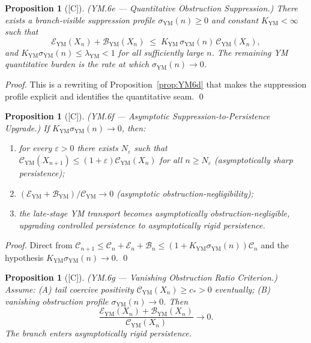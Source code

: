 \documentclass[12pt,oneside]{amsbook}
\theoremstyle{plain}
\newtheorem{proposition}[theorem]{Proposition}
\theoremstyle{definition}
\theoremstyle{remark}
\newcommand{\status}[1]{\textup{[#1]}}
\begin{document}
\begin{proposition}[\status{C}]\label{prop:YM6e}
\textup{(YM.6e --- Quantitative Obstruction Suppression.)}
There exists a branch-visible suppression profile
$\sigma_{\mathrm{YM}}(n) \geq 0$ and constant $K_{\mathrm{YM}} <
\infty$ such that
\[
 \mathcal{E}_{\mathrm{YM}}(X_n) + \mathcal{B}_{\mathrm{YM}}(X_n)
 \;\leq\; K_{\mathrm{YM}}\,\sigma_{\mathrm{YM}}(n)\,
 \mathcal{C}_{\mathrm{YM}}(X_n),
\]
and $K_{\mathrm{YM}}\sigma_{\mathrm{YM}}(n) \leq
\lambda_{\mathrm{YM}} < 1$ for all sufficiently large $n$.
The remaining YM quantitative burden is the rate at which
$\sigma_{\mathrm{YM}}(n) \to 0$.
\end{proposition}

\begin{proof}
This is a rewriting of Proposition~\ref{prop:YM6d} that makes the
suppression profile explicit and identifies the quantitative seam. \qed
\end{proof}

\begin{proposition}[\status{C}]\label{prop:YM6f}
\textup{(YM.6f --- Asymptotic Suppression-to-Persistence Upgrade.)}
If $K_{\mathrm{YM}}\sigma_{\mathrm{YM}}(n) \to 0$, then:
\begin{enumerate}[label=\textup{(\roman*)}]
 \item for every $\varepsilon > 0$ there exists $N_\varepsilon$
 such that $\mathcal{C}_{\mathrm{YM}}(X_{n+1}) \leq
 (1+\varepsilon)\mathcal{C}_{\mathrm{YM}}(X_n)$ for all
 $n \geq N_\varepsilon$ (asymptotically sharp persistence);
 \item $(\mathcal{E}_{\mathrm{YM}}+\mathcal{B}_{\mathrm{YM}}) /
 \mathcal{C}_{\mathrm{YM}} \to 0$ (asymptotic
 obstruction-negligibility);
 \item the late-stage YM transport becomes asymptotically
 obstruction-negligible, upgrading controlled persistence to
 asymptotically rigid persistence.
\end{enumerate}
\end{proposition}

\begin{proof}
Direct from $\mathcal{C}_{n+1} \leq \mathcal{C}_n +
\mathcal{E}_n + \mathcal{B}_n \leq (1 +
K_{\mathrm{YM}}\sigma_{\mathrm{YM}}(n))\mathcal{C}_n$ and the
hypothesis $K_{\mathrm{YM}}\sigma_{\mathrm{YM}}(n) \to 0$. \qed
\end{proof}

\begin{proposition}[\status{C}]\label{prop:YM6g}
\textup{(YM.6g --- Vanishing Obstruction Ratio Criterion.)}
Assume: \textup{(A)} tail coercive positivity
$\mathcal{C}_{\mathrm{YM}}(X_n) \geq c_* > 0$ eventually;
\textup{(B)} vanishing obstruction profile $\sigma_{\mathrm{YM}}(n)
\to 0$. Then
\[
 \frac{\mathcal{E}_{\mathrm{YM}}(X_n) +
 \mathcal{B}_{\mathrm{YM}}(X_n)}{\mathcal{C}_{\mathrm{YM}}(X_n)}
 \to 0.
\]
The branch enters asymptotically rigid persistence.
\end{proposition}
\end{document}
